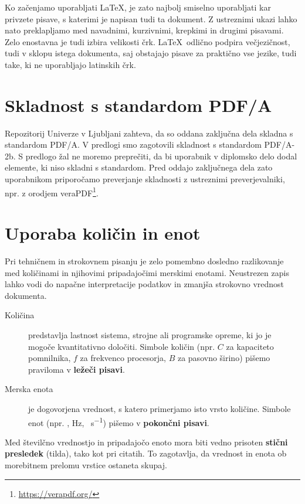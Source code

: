 \documentclass[a4paper,12pt,openright]{book}
\begin{document}
Ko začenjamo uporabljati \LaTeX, je zato najbolj smiselno uporabljati kar privzete pisave, s katerimi je napisan tudi ta dokument.
Z ustreznimi ukazi  lahko nato preklapljamo med navadnimi, kurzivnimi, krepkimi in drugimi pisavami.
Zelo enostavna je tudi izbira velikosti črk.
\LaTeX\  odlično podpira večjezičnost, tudi v sklopu istega dokumenta, saj obstajajo pisave za praktično vse jezike, tudi take, ki ne uporabljajo latinskih črk.

\section{Skladnost s standardom PDF/A}

Repozitorij Univerze v Ljubljani zahteva, da so oddana zaključna dela skladna s standardom PDF/A. V predlogi smo zagotovili skladnost s standardom PDF/A-2b. S predlogo žal ne moremo preprečiti, da bi uporabnik v diplomsko delo dodal elemente, ki niso skladni s standardom. Pred oddajo zaključnega dela zato uporabnikom priporočamo preverjanje skladnosti z ustreznimi preverjevalniki, npr. z orodjem veraPDF\footnote{\url{https://verapdf.org/}}.

\section{Uporaba količin in enot}

Pri tehničnem in strokovnem pisanju je zelo pomembno dosledno razlikovanje med količinami in njihovimi pripadajočimi merskimi enotami. Neustrezen zapis lahko vodi do napačne interpretacije podatkov in zmanjša strokovno vrednost dokumenta.

\begin{description}
    \item[Količina] predstavlja lastnost sistema, strojne ali programske opreme, ki jo je mogoče kvantitativno določiti. Simbole količin (npr. $C$ za kapaciteto pomnilnika, $f$ za frekvenco procesorja, $B$ za pasovno širino) pišemo praviloma v \textbf{ležeči pisavi}.
    \item[Merska enota] je dogovorjena vrednost, s katero primerjamo isto vrsto količine. Simbole enot (npr. \unit{\byte}, \unit{\hertz}, \unit{\bit\per\second}) pišemo v \textbf{pokončni pisavi}.
\end{description}

Med številčno vrednostjo in pripadajočo enoto mora biti vedno prisoten \textbf{stični presledek} (tilda), tako kot pri citatih. To zagotavlja, da vrednost in enota ob morebitnem prelomu vrstice ostaneta skupaj.
\end{document}
